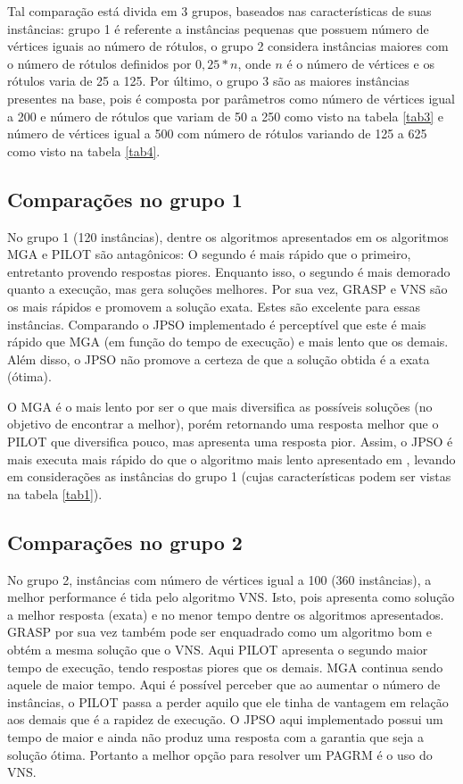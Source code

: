\documentclass{sig-alternate-05-2015}
\begin{document}
Tal comparação está divida em 3 grupos, baseados nas características de suas instâncias: grupo 1 é referente a instâncias pequenas que possuem número de
vértices iguais ao número de rótulos, o grupo 2 considera instâncias maiores com o número de rótulos definidos por $0,25 * n$, onde $n$ é o número de vértices
e os rótulos varia de 25 a 125. Por último, o grupo 3 são as maiores instâncias presentes na base, pois é composta por parâmetros como número de vértices
igual a 200 e número de rótulos que variam de 50 a 250 como visto na tabela \ref{tab3} e número de vértices igual a 500 com número de rótulos variando de 125
a 625 como visto na tabela \ref{tab4}.
\subsection{Comparações no grupo 1}
No grupo 1 (120 instâncias), dentre os algoritmos apresentados em \cite{consoli2009greedy} os algoritmos MGA e PILOT são antagônicos: O segundo é mais rápido
que o primeiro, entretanto provendo respostas piores. Enquanto isso, o segundo é mais demorado quanto a execução, mas gera soluções melhores. Por sua vez, GRASP
e VNS são os mais rápidos e promovem a solução exata. Estes são excelente para essas instâncias. Comparando o JPSO implementado é perceptível que este é
mais rápido que MGA (em função do tempo de execução) e mais lento que os demais. Além disso, o JPSO não promove a certeza de que a solução obtida é a exata
(ótima).

O MGA é o mais lento por ser o que mais diversifica as possíveis soluções (no objetivo de encontrar a melhor), porém retornando uma resposta melhor que o PILOT
que
diversifica pouco, mas apresenta uma resposta pior. Assim, o JPSO é mais executa mais rápido do que o algoritmo mais lento apresentado em \cite{consoli2009greedy}
, levando em considerações as instâncias do grupo 1 (cujas características podem ser vistas na tabela \ref{tab1}).



\subsection{Comparações no grupo 2}
        No grupo 2, instâncias com número de vértices igual a 100 (360 instâncias), a melhor performance é tida pelo algoritmo VNS. Isto, pois apresenta como
solução a melhor resposta (exata) e no menor tempo dentre os algoritmos apresentados. GRASP por sua vez também pode ser enquadrado como um algoritmo bom e obtém
a mesma solução que o VNS. Aqui PILOT apresenta o segundo maior tempo de execução, tendo respostas piores que os demais. MGA continua sendo aquele de maior tempo.
Aqui é possível perceber que ao aumentar o número de instâncias, o PILOT passa a perder aquilo que ele tinha de vantagem em relação aos demais que é a rapidez
de execução. O JPSO aqui implementado possui um tempo de maior e ainda não produz uma resposta com a garantia que seja a solução ótima. Portanto a melhor opção
para resolver um PAGRM é o uso do VNS.
\end{document}
